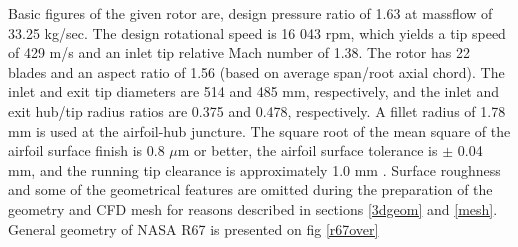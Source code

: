 Basic figures of the given rotor are, design pressure ratio of 1.63 at massflow of 33.25 kg/sec. The design rotational speed is 16 043 rpm, which yields a tip speed of 429 m/s and an inlet tip relative Mach number of 1.38. The rotor has 22 blades and an aspect ratio of 1.56 (based on average span/root axial chord). The inlet and exit tip diameters are 514 and 485 mm, respectively, and the inlet and exit hub/tip radius ratios are 0.375 and 0.478, respectively. A fillet radius of 1.78 mm is used at the airfoil-hub juncture. The square root of the mean square of the airfoil surface finish is 0.8 $\mu${}m or better, the airfoil surface tolerance is $\pm$ 0.04 mm, and the running tip clearance is approximately 1.0 mm \citep{r67laser}. Surface roughness and some of the geometrical features are omitted during the preparation of the geometry and CFD mesh for reasons described in sections \ref{3dgeom} and \ref{mesh}. General geometry of NASA R67 is presented on fig \ref{r67over}




